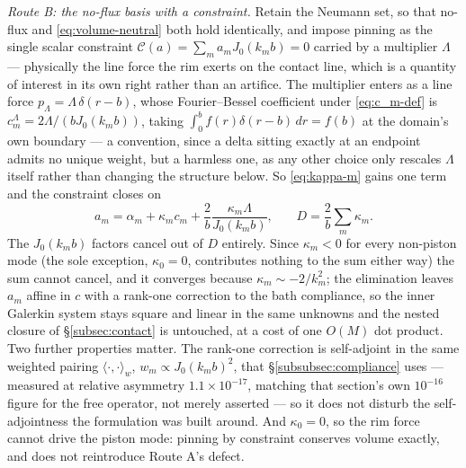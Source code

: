 \emph{Route B: the no-flux basis with a constraint.} Retain the Neumann set, so that no-flux and \eqref{eq:volume-neutral} both hold identically, and impose pinning as the single scalar constraint $\mathcal C(a)=\sum_ma_mJ_0(k_mb)=0$ carried by a multiplier $\Lambda$ --- physically the line force the rim exerts on the contact line, which is a quantity of interest in its own right rather than an artifice. The multiplier enters as a line force $p_\Lambda=\Lambda\,\delta(r-b)$, whose Fourier--Bessel coefficient under \eqref{eq:c_m-def} is $c_m^\Lambda=2\Lambda/(bJ_0(k_mb))$, taking $\int_0^bf(r)\delta(r-b)\,dr=f(b)$ at the domain's own boundary --- a convention, since a delta sitting exactly at an endpoint admits no unique weight, but a harmless one, as any other choice only rescales $\Lambda$ itself rather than changing the structure below. So \eqref{eq:kappa-m} gains one term and the constraint closes on
\begin{equation}
    a_m = \alpha_m + \kappa_mc_m + \frac{2}{b}\frac{\kappa_m\Lambda}{J_0(k_mb)}\text{,}\qquad
    D = \frac{2}{b}\sum_m\kappa_m\text{.}
    \label{eq:route-b-multiplier}
\end{equation}
The $J_0(k_mb)$ factors cancel out of $D$ entirely. Since $\kappa_m<0$ for every non-piston mode (the sole exception, $\kappa_0=0$, contributes nothing to the sum either way) the sum cannot cancel, and it converges because $\kappa_m\sim-2/k_m^2$; the elimination leaves $a_m$ affine in $c$ with a rank-one correction to the bath compliance, so the inner Galerkin system stays square and linear in the same unknowns and the nested closure of \S\ref{subsec:contact} is untouched, at a cost of one $O(M)$ dot product. Two further properties matter. The rank-one correction is self-adjoint in the same weighted pairing $\langle\cdot,\cdot\rangle_w$, $w_m\propto J_0(k_mb)^2$, that \S\ref{subsubsec:compliance} uses --- measured at relative asymmetry $1.1\times10^{-17}$, matching that section's own $10^{-16}$ figure for the free operator, not merely asserted --- so it does not disturb the self-adjointness the formulation was built around. And $\kappa_0=0$, so the rim force cannot drive the piston mode: pinning by constraint conserves volume exactly, and does not reintroduce Route A's defect.

